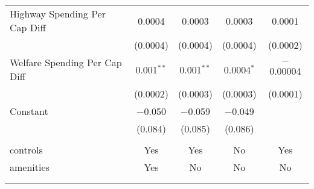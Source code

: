\begin{table}[!htbp]
\begin{tabular}{@{\extracolsep{5pt}}lcccc}
  Highway Spending Per Cap Diff & 0.0004 & 0.0003 & 0.0003 & 0.0001 \\ 
  & (0.0004) & (0.0004) & (0.0004) & (0.0002) \\ 
  Welfare Spending Per Cap Diff & 0.001$^{**}$ & 0.001$^{**}$ & 0.0004$^{*}$ & $-$0.00004 \\ 
  & (0.0002) & (0.0003) & (0.0003) & (0.0001) \\ 
  Constant & $-$0.050 & $-$0.059 & $-$0.049 &  \\ 
  & (0.084) & (0.085) & (0.086) &  \\ 
 \hline \\[-1.8ex] 
controls & Yes & Yes & No & Yes \\ 
amenities & Yes & No & No & No \\ 
\hline \\[-1.8ex] 
\hline 
\hline \\[-1.8ex] 
\end{tabular} 
\end{table} 
